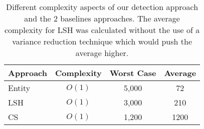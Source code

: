 \begin{table}[h]
	\centering
	\small
  \caption[Complexity, theoretical worst case, and average comparisons for different event detection approaches.]{Different complexity aspects of our detection approach and the 2 baselines approaches. The average complexity for LSH was calculated without the use of a variance reduction technique which would push the average higher. }
  \label{detection:table:efficiency}

	\begin{tabulary}{\textwidth}{l c c c }
	  \toprule
	  \textbf{Approach} & \textbf{Complexity} & \textbf{Worst Case} & \textbf{Average}  \\
	  \midrule
		Entity & \(O(1)\) & 5,000 & 72 \\
		LSH & \(O(1)\) & 3,000 & 210 \\
		CS & \(O(1)\) & 1,200 & 1200 \\
	  \bottomrule
	\end{tabulary}

\end{table}